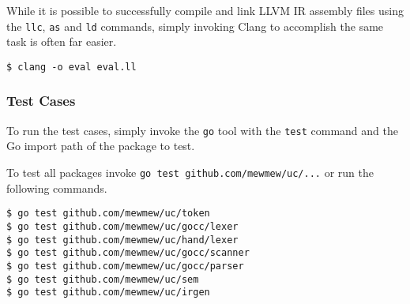 While it is possible to successfully compile and link LLVM IR assembly files using the \texttt{llc}, \texttt{as} and \texttt{ld} commands, simply invoking Clang to accomplish the same task is often far easier.

\begin{verbatim}
$ clang -o eval eval.ll
\end{verbatim}

\subsubsection{Test Cases}
\label{sec:irgen_test_cases}

To run the test cases, simply invoke the \texttt{go} tool with the \texttt{test} command and the Go import path of the package to test.

To test all packages invoke \texttt{go test github.com/mewmew/uc/...} or run the following commands.

\begin{verbatim}
$ go test github.com/mewmew/uc/token
$ go test github.com/mewmew/uc/gocc/lexer
$ go test github.com/mewmew/uc/hand/lexer
$ go test github.com/mewmew/uc/gocc/scanner
$ go test github.com/mewmew/uc/gocc/parser
$ go test github.com/mewmew/uc/sem
$ go test github.com/mewmew/uc/irgen
\end{verbatim}
